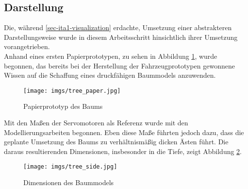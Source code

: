 \documentclass[.../Dokumentation.tex]{subfiles}
\begin{document}
\subsection{Darstellung}\label{sec-ita2-visualization}
Die, während \ref{sec-ita1-visualization} erdachte, Umsetzung einer abstrakteren 
Darstellungsweise wurde in diesem Arbeitsschritt hinsichtlich ihrer Umsetzung 
vorangetrieben.\\
Anhand eines ersten Papierprototypen, zu sehen in Abbildung 
\ref{fig-tree-paper}, wurde begonnen, das bereits bei der Herstellung der 
Fahrzeugprototypen gewonnene Wissen auf die Schaffung eines druckfähigen 
Baummodels anzuwenden.
\begin{figure}[H]
\begin{center}
    \texttt{[image: imgs/tree\_paper.jpg]}
    \caption{Papierprototyp des Baums}
    \label{fig-tree-paper}
\end{center}
\end{figure}
\noindent
Mit den Maßen der Servomotoren als Referenz wurde mit den Modellierungsarbeiten 
begonnen. Eben diese Maße führten jedoch dazu, dass die geplante Umsetzung 
des Baums zu verhältnismäßig dicken Ästen führt. 
Die daraus resultierenden Dimensionen, insbesonder in die Tiefe, zeigt 
Abbildung \ref{fig-tree-side}.
\begin{figure}[H]
\begin{center}
    \texttt{[image: imgs/tree\_side.jpg]}
    \caption{Dimensionen des Baummodels}
    \label{fig-tree-side}
\end{center}
\end{figure}
\end{document}
